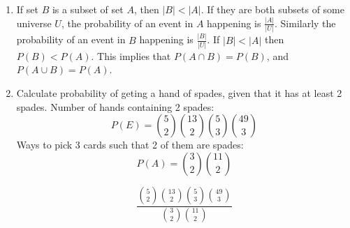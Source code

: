 \documentclass{article}
\begin{document}
\begin{enumerate}
		\item
			If set \(B\) is a subset of set \(A\), then \(|B| < |A|\). If they are both subsets of some universe \(U\), the probability of an event in \(A\) happening is \(\frac{|A|}{|U|}\). Similarly the probability of an event in \(B\) happening is \(\frac{|B|}{|U|}\). If \(|B| < |A|\) then \(P(B) < P(A)\). This implies that \(P(A \cap B) = P(B)\), and \(P(A \cup B) = P(A)\).

		\item Calculate probability of geting a hand of spades, given that it has at least 2 spades.
		Number of hands containing 2 spades:
		\[ P(E) = \binom{5}{2} \binom{13}{2} \binom{5}{3} \binom{49}{3} \]
		Ways to pick 3 cards such that 2 of them are spades:
		\[ P(A) = \binom{3}{2} \binom{11}{2} \]

		\[ \frac{\binom{5}{2} \binom{13}{2} \binom{5}{3} \binom{49}{3}}{\binom{3}{2} \binom{11}{2}} \]
	\end{enumerate}
\end{document}

